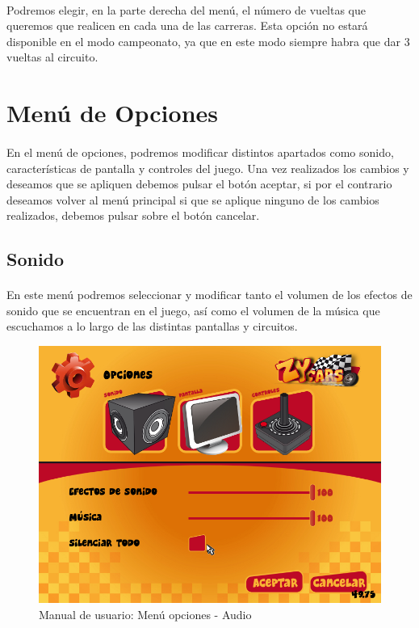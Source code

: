 \paragraph{}
Podremos elegir, en la parte derecha del menú, el número de vueltas que queremos que realicen en cada una de las carreras. Esta opción
no estará disponible en el modo campeonato, ya que en este modo siempre habra que dar 3 vueltas al circuito.

\section{Menú de Opciones}

\paragraph{}
En el menú de opciones, podremos modificar distintos apartados como sonido, características de pantalla y controles del juego. 
Una vez realizados los cambios y deseamos que se apliquen debemos pulsar el botón aceptar, si por el contrario deseamos volver al
menú principal si que se aplique ninguno de los cambios realizados, debemos pulsar sobre el botón cancelar.

\subsection{Sonido}

\paragraph{}
En este menú podremos seleccionar y modificar tanto el volumen de los efectos de sonido que se encuentran en el juego, así 
como el volumen de la música que escuchamos a lo largo de las distintas pantallas y circuitos.

\begin{figure}[H]
  \label{menu_audio}
  \begin{center}
    \includegraphics[scale=0.4]{imagenes/capturas/menuopcionesaudio.png}
  \end{center}
 \caption{Manual de usuario: Menú opciones - Audio}
\end{figure}


